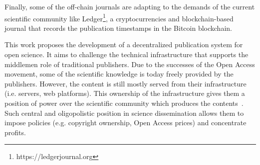Finally, some of the off-chain journals are adapting to the demands of the
current scientific community like Ledger\footnote{https://ledgerjournal.org}, a
cryptocurrencies and blockchain-based journal that records the publication
timestamps in the Bitcoin blockchain.


This work proposes the development of a decentralized publication system for
open science. It aims to challenge the technical infrastructure that supports
the middlemen role of traditional publishers. Due to the successes of the Open
Access movement, some of the scientific knowledge is today freely provided by
the publishers. However, the content is still mostly served from their
infrastructure (i.e. servers, web platforms). This ownership of the
infrastructure gives them a position of power over the scientific community
which produces the contents~\cite{fuster2010governance}. Such central and
oligopolistic position in science dissemination allows them to impose policies
(e.g. copyright ownership, Open Access prices) and concentrate profits.


